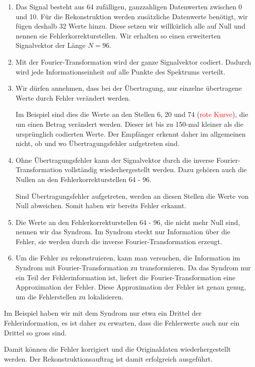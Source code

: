 \begin{enumerate}[(1)]
 \item Das Signal besteht aus 64 zufälligen, ganzzahligen Datenwerten zwischen 0 und 10.
 Für die Rekonstruktion werden zusätzliche Datenwerte benötigt, wir fügen deshalb 32 Werte hinzu.
 Diese setzen wir willkürlich alle auf Null und nennen sie Fehlerkorrekturstellen.
 Wir erhalten so einen erweiterten Signalvektor der Länge $N =96$.
 \item Mit der Fourier-Transformation wird der ganze Signalvektor codiert.
 Dadurch wird jede Informationseinheit auf alle Punkte des Spektrums verteilt.
 \item Wir dürfen annehmen, dass bei der Übertragung, nur einzelne übertragene 
 	Werte durch Fehler verändert werden.
 \par 
 Im Beispiel sind dies die Werte an den Stellen 6, 20 und 74 (\textcolor{red}{rote Kurve}),
 	die um einen Betrag verändert werden.
 Dieser ist bis zu 150-mal kleiner als die ursprünglich codierten Werte. 
 Der Empfänger erkennt daher im allgemeinen nicht, ob und wo Übertragungsfehler aufgetreten sind.
 \item Ohne Übertragungsfehler kann der Signalvektor durch die inverse Fourier-Transformation vollständig
 	wiederhergestellt werden.
 Dazu gehören auch die Nullen an den Fehlerkorrekturstellen 64 - 96.
 \par 
 Sind Übertragungsfehler aufgetreten, werden an diesen Stellen die Werte von Null abweichen.
 Somit haben wir bereits Fehler erkannt.
 \item Die Werte an den Fehlerkorrekturstellen 64 - 96, die nicht mehr Null sind, nennen wir das Syndrom.
 Im Syndrom steckt nur Information über die Fehler, sie werden durch die inverse Fourier-Transformation erzeugt.
 \item Um die Fehler zu rekonstruieren, kann man versuchen, die Information im Syndrom mit Fourier-Transformation zu transformieren.
 Da das Syndrom nur ein Teil der Fehlerinformation ist, liefert die Fourier-Transformation eine Approximation der Fehler.
 Diese Approximation der Fehler ist genau genug, um die Fehlerstellen zu lokalisieren.
\end{enumerate}
Im Beispiel haben wir mit dem Syndrom nur etwa ein Drittel der Fehlerinformation, es ist daher zu erwarten, 
dass die Fehlerwerte auch nur ein Drittel so gross sind.
\par 
Damit können die Fehler korrigiert und die Originaldaten wiederhergestellt werden.
Der Rekonstruktionsauftrag ist damit erfolgreich ausgeführt.

